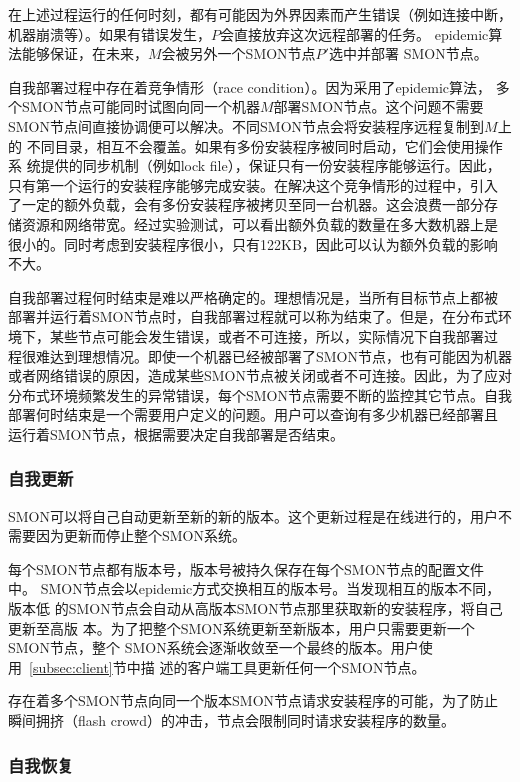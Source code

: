 在上述过程运行的任何时刻，都有可能因为外界因素而产生错误（例如连接中断，
机器崩溃等）。如果有错误发生，$P$会直接放弃这次远程部署的任务。
epidemic算法能够保证，在未来，$M$会被另外一个SMON节点$P'$选中并部署
SMON节点。

自我部署过程中存在着竞争情形（race condition）。因为采用了epidemic算法，
多个SMON节点可能同时试图向同一个机器$M$部署SMON节点。这个问题不需要
SMON节点间直接协调便可以解决。不同SMON节点会将安装程序远程复制到$M$上的
不同目录，相互不会覆盖。如果有多份安装程序被同时启动，它们会使用操作系
统提供的同步机制（例如lock file），保证只有一份安装程序能够运行。因此，
只有第一个运行的安装程序能够完成安装。在解决这个竞争情形的过程中，引入
了一定的额外负载，会有多份安装程序被拷贝至同一台机器。这会浪费一部分存
储资源和网络带宽。经过实验测试，可以看出额外负载的数量在多大数机器上是
很小的。同时考虑到安装程序很小，只有122KB，因此可以认为额外负载的影响
不大。

自我部署过程何时结束是难以严格确定的。理想情况是，当所有目标节点上都被
部署并运行着SMON节点时，自我部署过程就可以称为结束了。但是，在分布式环
境下，某些节点可能会发生错误，或者不可连接，所以，实际情况下自我部署过
程很难达到理想情况。即使一个机器已经被部署了SMON节点，也有可能因为机器
或者网络错误的原因，造成某些SMON节点被关闭或者不可连接。因此，为了应对
分布式环境频繁发生的异常错误，每个SMON节点需要不断的监控其它节点。自我
部署何时结束是一个需要用户定义的问题。用户可以查询有多少机器已经部署且
运行着SMON节点，根据需要决定自我部署是否结束。

\subsubsection*{自我更新}

SMON可以将自己自动更新至新的新的版本。这个更新过程是在线进行的，用户不
需要因为更新而停止整个SMON系统。

每个SMON节点都有版本号，版本号被持久保存在每个SMON节点的配置文件中。
SMON节点会以epidemic方式交换相互的版本号。当发现相互的版本不同，版本低
的SMON节点会自动从高版本SMON节点那里获取新的安装程序，将自己更新至高版
本。为了把整个SMON系统更新至新版本，用户只需要更新一个SMON节点，整个
SMON系统会逐渐收敛至一个最终的版本。用户使用~\ref{subsec:client}节中描
述的客户端工具更新任何一个SMON节点。

存在着多个SMON节点向同一个版本SMON节点请求安装程序的可能，为了防止
瞬间拥挤（flash crowd）的冲击，节点会限制同时请求安装程序的数量。

\subsubsection*{自我恢复}


